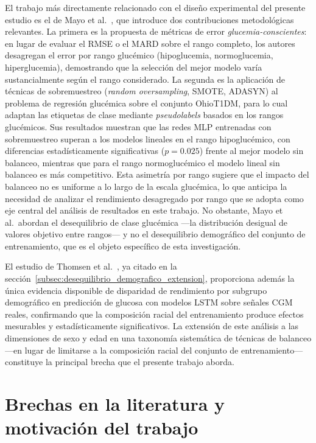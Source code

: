 El trabajo más directamente relacionado con el diseño experimental del presente
estudio es el de Mayo et al.~\cite{mayo2019glycemic}, que introduce dos
contribuciones metodológicas relevantes. La primera es la propuesta de métricas
de error \emph{glucemia-conscientes}: en lugar de evaluar el RMSE o el MARD
sobre el rango completo, los autores desagregan el error por rango glucémico
(hipoglucemia, normoglucemia, hiperglucemia), demostrando que la selección del
mejor modelo varía sustancialmente según el rango considerado. La segunda es la
aplicación de técnicas de sobremuestreo (\emph{random oversampling}, SMOTE,
ADASYN) al problema de regresión glucémica sobre el conjunto OhioT1DM, para lo
cual adaptan las etiquetas de clase mediante \emph{pseudolabels} basados en los
rangos glucémicos. Sus resultados muestran que las redes MLP entrenadas con
sobremuestreo superan a los modelos lineales en el rango hipoglucémico, con
diferencias estadísticamente significativas ($p=0.025$) frente al mejor modelo
sin balanceo, mientras que para el rango normoglucémico el modelo lineal sin
balanceo es más competitivo. Esta asimetría por rango sugiere que el impacto del
balanceo no es uniforme a lo largo de la escala glucémica, lo que anticipa la
necesidad de analizar el rendimiento desagregado por rango que se adopta como eje
central del análisis de resultados en este trabajo. No obstante, Mayo et al.\
abordan el desequilibrio de clase glucémica —la distribución desigual de valores
objetivo entre rangos— y no el desequilibrio demográfico del conjunto de
entrenamiento, que es el objeto específico de esta investigación.

El estudio de Thomsen et al.~\cite{thomsen2025racial}, ya citado en la
sección~\ref{subsec:desequilibrio_demografico_extension}, proporciona además la
única evidencia disponible de disparidad de rendimiento por subgrupo demográfico
en predicción de glucosa con modelos LSTM sobre señales CGM reales, confirmando
que la composición racial del entrenamiento produce efectos mesurables y
estadísticamente significativos. La extensión de este análisis a las dimensiones
de sexo y edad en una taxonomía sistemática de técnicas de balanceo —en lugar de
limitarse a la composición racial del conjunto de entrenamiento— constituye la
principal brecha que el presente trabajo aborda.


\section{Brechas en la literatura y motivación del trabajo}
\label{sec:brechas_motivacion}

